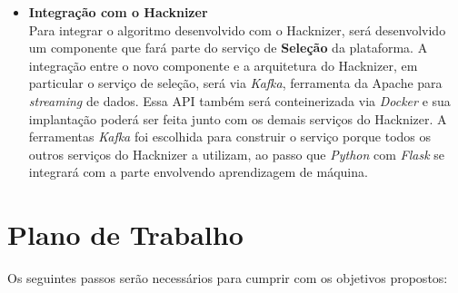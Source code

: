 \documentclass[10pt,twoside,a4paper]{article}
\begin{document}
\begin{itemize}
          \item \textbf{Integração com o Hacknizer} \\
          Para integrar o algoritmo desenvolvido com o Hacknizer, será desenvolvido um componente que fará parte do serviço de \textbf{Seleção} da plataforma. A integração entre o novo componente e a arquitetura do Hacknizer, em particular o serviço de seleção, será via \textit{Kafka}, ferramenta da Apache para \textit{streaming} de dados. Essa API também será conteinerizada via \textit{Docker} e sua implantação poderá ser feita junto com os demais serviços do Hacknizer.
          A ferramentas \textit{Kafka} foi escolhida para construir o serviço porque todos os outros serviços do Hacknizer a utilizam, ao passo que \textit{Python} com \textit{Flask} se integrará com a parte envolvendo aprendizagem de máquina.
      \end{itemize}
    
\section{Plano de Trabalho}
  
  Os seguintes passos serão necessários para cumprir com os objetivos propostos:
\end{document}
